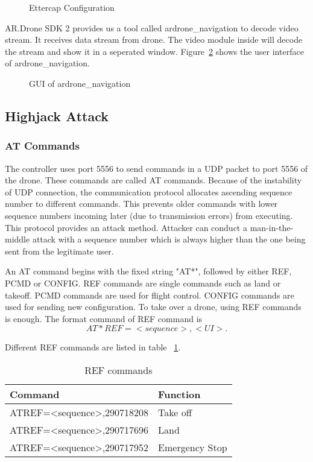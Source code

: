 \documentclass{acm_proc_article-sp}
\begin{document}
\begin{figure}
\centering
{}
\caption{Ettercap Configuration}
\label{ettercap}
\end{figure}


AR.Drone SDK 2 \cite{sdk} provides us a tool called ardrone\_navigation to decode video stream. It receives data stream from drone. The video module inside will decode the stream and show it in a seperated window. Figure~\ref{navigation} shows the user interface of ardrone\_navigation.

\begin{figure}
\centering
{}
\caption{GUI of ardrone\_navigation}
\label{navigation}
\end{figure}


\subsection{Highjack Attack}

\subsubsection{AT Commands}
 The controller uses port 5556 to send commands in a UDP packet to port 5556 of the drone\cite{dev:guide}. These commands are called AT commands. Because of the instability of UDP connection, the communication protocol allocates ascending sequence number to different commands. This prevents older commands with lower sequence numbers incoming later (due to transmission errors) from executing\cite{hack:secure}. This protocol provides an attack method. Attacker can conduct a man-in-the-middle attack with a sequence number which is always higher than the one being sent from the legitimate user.

An AT command begins with the fixed string "AT*", followed by either REF, PCMD or CONFIG. REF commands are single commands such as land or takeoff. PCMD commands are used for flight control. CONFIG commands are used for sending new configuration. To take over a drone, using REF commands is enough. The format command of REF command is 
\begin{equation}
  AT*REF=<sequence>,<UI>.
\end{equation}


Different REF commands are listed in table ~\ref{refcom}.

\begin{table}
\centering
\caption{REF commands}
\label{refcom}
\begin{tabular}{@{}ll@{}} \hline
Command                                            & Function       \\ \hline
AT\*REF=\textless{}sequence\textgreater{},290718208 & Take off       \\ \hline
AT\*REF=\textless{}sequence\textgreater{},290717696 & Land           \\ \hline
AT\*REF=\textless{}sequence\textgreater{},290717952 & Emergency Stop \\ \hline
\end{tabular}
\end{table}
\end{document}
